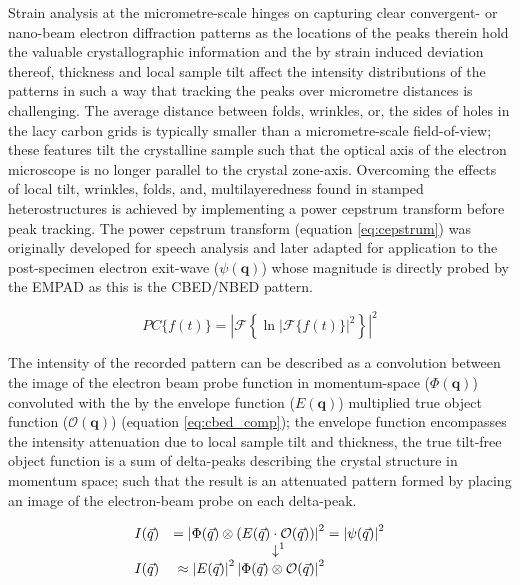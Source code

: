 Strain analysis at the micrometre-scale hinges on capturing clear convergent- or nano-beam electron diffraction patterns as the locations of the peaks therein hold the valuable crystallographic information and the by strain induced deviation thereof, thickness and local sample tilt affect the intensity distributions of the patterns in such a way that tracking the peaks over micrometre distances is challenging. %
%
The average distance between folds, wrinkles, or, the sides of holes in the lacy carbon grids is typically smaller than a micrometre-scale field-of-view; these features tilt the crystalline sample such that the optical axis of the electron microscope is no longer parallel to the crystal zone-axis. Overcoming the effects of local tilt, wrinkles, folds, and, multilayeredness found in stamped heterostructures is achieved by implementing a power cepstrum transform before peak tracking.
%
The power cepstrum transform (equation \ref{eq:cepstrum}) was originally developed for speech analysis \cite{1570854175999207936, oppenheimDspHistoryFrequency2004,nollCepstrumPitchDetermination1967} and later adapted for application to the post-specimen electron exit-wave ($\psi(\mathbf{q})$) whose magnitude is directly probed by the EMPAD \cite{padgettExitwavePowercepstrumTransform2020} as this is the CBED/NBED pattern.

\begin{equation}
	PC\{f(t)\} = \left| \mathscr{F} \left\{ \ln{\left| \mathscr{F}\{f(t)\} \right|^2} \right\} \right|^2
	\label{eq:cepstrum}
\end{equation}

The intensity of the recorded pattern can be described as a convolution between the image of the electron beam probe function in momentum-space ($\Phi(\mathbf{q})$) convoluted with the by the envelope function ($E(\mathbf{q})$) multiplied true object function ($\mathcal{O}(\mathbf{q})$) (equation \ref{eq:cbed_comp}); the envelope function encompasses the intensity attenuation due to local sample tilt and thickness, the true tilt-free object function is a sum of delta-peaks describing the crystal structure in momentum space; such that the result is an attenuated pattern formed by placing an image of the electron-beam probe on each delta-peak. 

\begin{alignat}{2}
	I(\vec{q}) &  & = \left| \Phi(\vec{q}) \otimes \left( E(\vec{q}) \cdot \mathcal{O}(\vec{q}) \right) \right|^2 & = \left| \psi(\vec{q}) \right|^2
	\label{eq:cbed_comp}                                                                                                                             \\
	\ArrowBetweenLines*[\downarrow^1\hspace{1cm}]%
	I(\vec{q}) &  & \approx \left|E(\vec{q}) \right|^2 \left|\Phi(\vec{q}) \otimes \mathcal{O}(\vec{q}) \right|^2 &
	\label{eq:cbed_approx}
\end{alignat}

